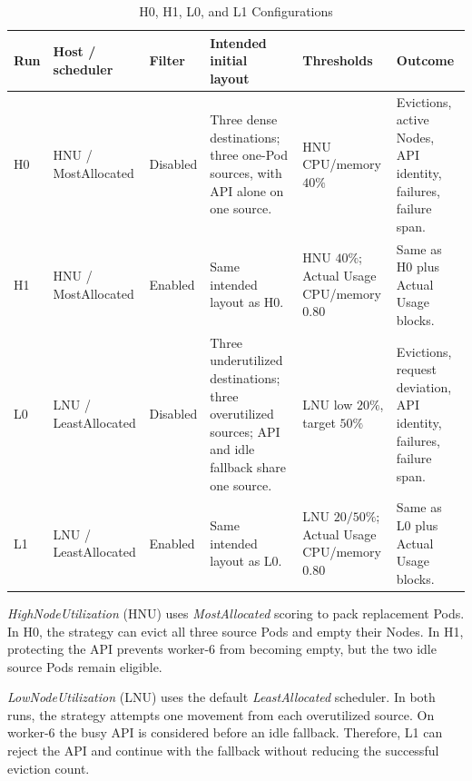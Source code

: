 \begin{table}[t]
    \centering
    \caption{H0, H1, L0, and L1 Configurations}
    \label{tab:comparison_systems}
    \small
    \renewcommand{\arraystretch}{1.2}
    \begin{tabular}{@{}l>{\raggedright\arraybackslash}p{2.4cm}
        >{\raggedright\arraybackslash}p{1.5cm}
        >{\raggedright\arraybackslash}p{4.3cm}
        >{\raggedright\arraybackslash}p{2.3cm}
        >{\raggedright\arraybackslash}p{3.5cm}@{}}
        \toprule
        \textbf{Run} & \textbf{Host / scheduler} &
        \textbf{Filter} & \textbf{Intended initial layout} &
        \textbf{Thresholds} & \textbf{Outcome} \\
        \midrule
        H0 & HNU / MostAllocated & Disabled &
        Three dense destinations; three one-Pod sources, with API alone on one source. &
        HNU CPU/memory \(40\%\) & Evictions, active Nodes, API identity,
        failures, failure span. \\
        H1 & HNU / MostAllocated & Enabled &
        Same intended layout as H0. &
        HNU \(40\%\); Actual Usage CPU/memory \(0.80\) & Same as H0 plus
        Actual Usage blocks. \\
        L0 & LNU / LeastAllocated & Disabled &
        Three underutilized destinations; three overutilized sources; API and
        idle fallback share one source. &
        LNU low \(20\%\), target \(50\%\) & Evictions, request deviation, API
        identity, failures, failure span. \\
        L1 & LNU / LeastAllocated & Enabled &
        Same intended layout as L0. &
        LNU \(20/50\%\); Actual Usage CPU/memory \(0.80\) & Same as L0 plus
        Actual Usage blocks. \\
        \bottomrule
    \end{tabular}
\end{table}

\textit{HighNodeUtilization} (HNU) uses \textit{MostAllocated} scoring to pack
replacement Pods. In H0, the strategy can evict all three source Pods and
empty their Nodes. In H1, protecting the API prevents worker-6 from becoming
empty, but the two idle source Pods remain eligible.

\textit{LowNodeUtilization} (LNU) uses the default
\textit{LeastAllocated} scheduler. In both runs, the strategy attempts one
movement from each overutilized source. On worker-6 the busy API is considered
before an idle fallback. Therefore, L1 can reject the API and continue with
the fallback without reducing the successful eviction count.

